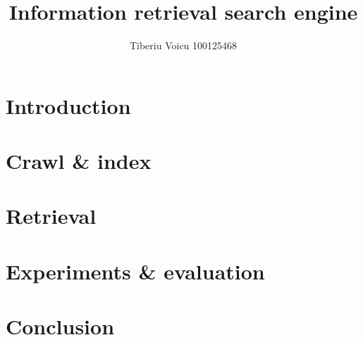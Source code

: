 \documentclass{ueacmpstyle}
\begin{document}
\title{Information retrieval search engine}

\author{Tiberiu Voicu 
100125468}
\maketitle

\section{Introduction}

\section{Crawl & index}

\section{Retrieval}

\section{Experiments & evaluation}

\section{Conclusion}
\end{document}
